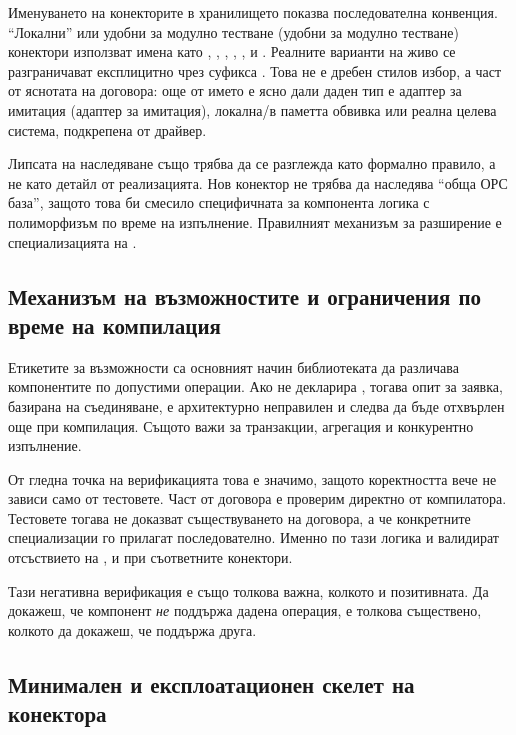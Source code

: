 Именуването на конекторите в хранилището показва последователна конвенция. ``Локални'' или удобни за модулно тестване (удобни за модулно тестване) конектори използват имена като , , , , ,  и . Реалните варианти на живо се разграничават експлицитно чрез суфикса . Това не е дребен стилов избор, а част от яснотата на договора: още от името е ясно дали даден тип е адаптер за имитация (адаптер за имитация), локална/в паметта обвивка или реална целева система, подкрепена от драйвер.

Липсата на наследяване също трябва да се разглежда като формално правило, а не като детайл от реализацията. Нов конектор не трябва да наследява ``обща ОРС база'', защото това би смесило специфичната за компонента логика с полиморфизъм по време на изпълнение. Правилният механизъм за разширение е специализацията на .

\subsection{Механизъм на възможностите и ограничения по време на компилация}

Етикетите за възможности са основният начин библиотеката да различава компонентите по допустими операции. Ако  не декларира , тогава опит за заявка, базирана на съединяване, е архитектурно неправилен и следва да бъде отхвърлен още при компилация. Същото важи за транзакции, агрегация и конкурентно изпълнение.

От гледна точка на верификацията това е значимо, защото коректността вече не зависи само от тестовете. Част от договора е проверим директно от компилатора. Тестовете тогава не доказват съществуването на договора, а че конкретните специализации го прилагат последователно. Именно по тази логика  и  валидират отсъствието на ,  и  при съответните конектори.

Тази негативна верификация е също толкова важна, колкото и позитивната. Да докажеш, че компонент \emph{не} поддържа дадена операция, е толкова съществено, колкото да докажеш, че поддържа друга.

\subsection{Минимален и експлоатационен скелет на конектора}


